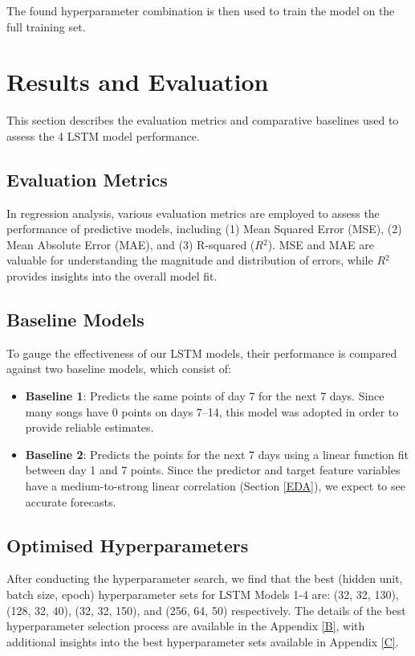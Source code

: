 \documentclass{article}
\begin{document}
The found hyperparameter combination is then used to train the model on the full training set. 


\section{Results and Evaluation}
This section describes the evaluation metrics and comparative baselines used to assess the 4 LSTM model performance.

\subsection{Evaluation Metrics}
In regression analysis, various evaluation metrics are employed to assess the performance of predictive models, including (1) Mean Squared Error (MSE), (2) Mean Absolute Error (MAE), and (3) R-squared ($R{^2}$).
MSE and MAE are valuable for understanding the magnitude and distribution of errors, while $R{^2}$ provides insights into the overall model fit.

\subsection{Baseline Models}

To gauge the effectiveness of our LSTM models, their performance is compared against two baseline models, which consist of:

\begin{itemize}[leftmargin=10pt]
  \item[] \textbf{Baseline 1}: Predicts the same points of day 7 for the next 7 days. Since many songs have 0 points on days 7–14, this model was adopted in order to provide reliable estimates.

  \item[] \textbf{Baseline 2}: Predicts the points for the next 7 days using a linear function fit between day 1 and 7 points. Since the predictor and target feature variables have a medium-to-strong linear correlation (Section \ref{EDA}), we expect to see accurate forecasts.

\end{itemize}

\subsection{Optimised Hyperparameters}
After conducting the hyperparameter search, we find that the best (hidden unit, batch size, epoch) hyperparameter sets for LSTM Models 1-4 are: (32, 32, 130), (128, 32, 40), (32, 32, 150), and (256, 64, 50) respectively. The details of the best hyperparameter selection process are available in the Appendix \ref{B}, with additional insights into the best hyperparameter sets available in Appendix \ref{C}.
\end{document}

